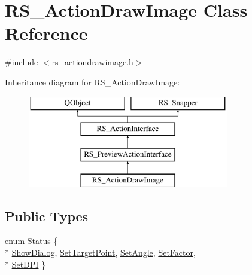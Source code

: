 \hypertarget{classRS__ActionDrawImage}{\section{R\-S\-\_\-\-Action\-Draw\-Image Class Reference}
\label{classRS__ActionDrawImage}
}


{\ttfamily \#include $<$rs\-\_\-actiondrawimage.\-h$>$}

Inheritance diagram for R\-S\-\_\-\-Action\-Draw\-Image\-:\begin{figure}[H]
\begin{center}
\leavevmode
\includegraphics[height=4.000000cm]{classRS__ActionDrawImage}
\end{center}
\end{figure}
\subsection*{Public Types}
\begin{DoxyCompactItemize}
\item 
enum \hyperlink{classRS__ActionDrawImage_ab906c07719d324614762be6778aa8b8b}{Status} \{ \\*
\hyperlink{classRS__ActionDrawImage_ab906c07719d324614762be6778aa8b8ba60329a9ec447de26b7ed37b0adf0234f}{Show\-Dialog}, 
\hyperlink{classRS__ActionDrawImage_ab906c07719d324614762be6778aa8b8ba392348f68f363ddc0f7fe8248a59b93a}{Set\-Target\-Point}, 
\hyperlink{classRS__ActionDrawImage_ab906c07719d324614762be6778aa8b8ba95f18797f475430414a72b75e15c0859}{Set\-Angle}, 
\hyperlink{classRS__ActionDrawImage_ab906c07719d324614762be6778aa8b8ba8931d219f98c0106043d353e3377afcc}{Set\-Factor}, 
\\*
\hyperlink{classRS__ActionDrawImage_ab906c07719d324614762be6778aa8b8baa60b35fe64da4ba1ee00f2a828257ff0}{Set\-D\-P\-I}
 \}
\end{DoxyCompactItemize}
